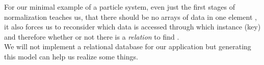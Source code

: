 \begin{table}[H]
	\parbox{0.5\linewidth}{
		\centering
	}	
	\parbox{0.5\linewidth}{
		\centering
	}

	\caption{Example excerpt of a possible first normalization step for the particle system and how it indicates bad design.}
	\label{normalized_ps}
\end{table}
For our minimal example of a particle system, even just the first stages of normalization teaches us, that there should be no arrays of data in one element , it also forces us to reconsider which data is accessed through which instance (key) and therefore whether or not there is a \textit{relation} to find .\\We will not implement a relational database for our application but generating this model can help us realize some things.
